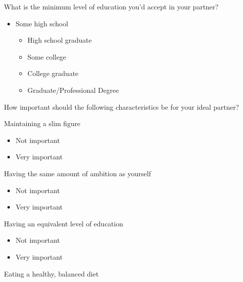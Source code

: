 \documentclass[twoside]{report}
\begin{document}
\begin{multicols}{2}
What is the minimum level of education you'd accept in your partner?

\begin{itemize}
\item
  Some high school

  \begin{itemize}
  \item
    High school graduate
  \end{itemize}

  \begin{itemize}
  \item
    Some college
  \item
    College graduate
  \item
    Graduate/Professional Degree
  \end{itemize}
\end{itemize}

How important should the following characteristics be for your ideal
partner?

Maintaining a slim figure

\begin{itemize}
\item
  Not important
\end{itemize}

\begin{itemize}
\item
  Very important
\end{itemize}

Having the same amount of ambition as yourself

\begin{itemize}
\item
  Not important
\end{itemize}

\begin{itemize}
\item
  Very important
\end{itemize}

Having an equivalent level of education

\begin{itemize}
\item
  Not important
\end{itemize}

\begin{itemize}
\item
  Very important
\end{itemize}

Eating a healthy, balanced diet


\end{multicols}
\end{document}
